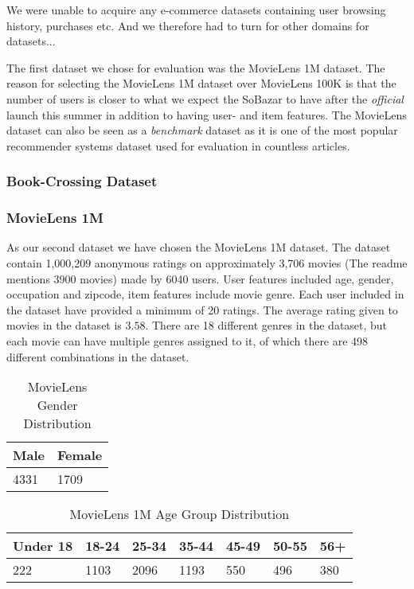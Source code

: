 We were unable to acquire any e-commerce datasets containing user browsing history, purchases etc. And we therefore had to turn for other domains for datasets...

The first dataset we chose for evaluation was the MovieLens 1M dataset. The reason for selecting the MovieLens 1M dataset over MovieLens 100K is that the number of users is closer to what we expect the SoBazar to have after the \emph{official} launch this summer in addition to having user- and item features. The MovieLens dataset can also be seen as a \emph{benchmark} dataset as it is one of the most popular recommender systems dataset used for evaluation in countless articles.

\subsubsection{Book-Crossing Dataset}



\subsubsection{MovieLens 1M}

As our second dataset we have chosen the MovieLens 1M dataset. The dataset contain 1,000,209 anonymous ratings on approximately 3,706 movies (The readme mentions 3900 movies) made by 6040 users. User features included age, gender, occupation and zipcode, item features include movie genre. Each user included in the dataset have provided a minimum of 20 ratings. The average rating given to movies in the dataset is $3.58$. There are 18 different genres in the dataset, but each movie can have multiple genres assigned to it, of which there are 498 different combinations in the dataset.

\begin{table}[H]
\centering
\begin{tabular}{|l|l|}
\hline
Male & Female \\ \hline
4331 & 1709 \\ \hline
\end{tabular}
\caption{MovieLens Gender Distribution}
\end{table}

\begin{table}[H]
\centering
\begin{tabular}{|l|l|l|l|l|l|l|}
\hline
Under 18 & 18-24 & 25-34 	& 35-44 	& 45-49 & 50-55 & 56+ \\ \hline
222		 &	1103 &	2096	&	1193	& 550	& 496	& 380 \\ \hline
\end{tabular}
\caption{MovieLens 1M Age Group Distribution}
\end{table}

